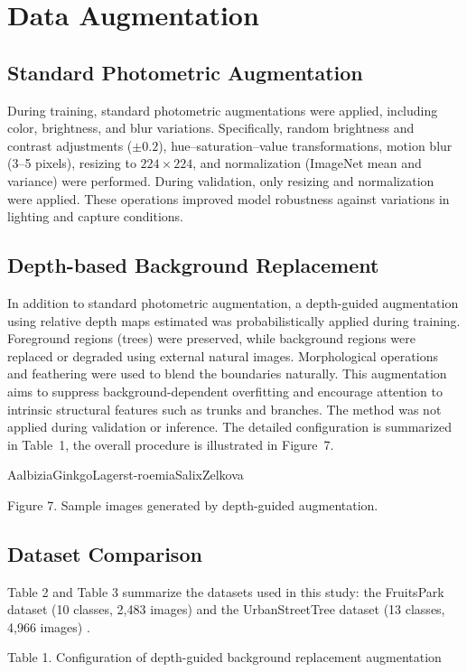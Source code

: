 \section{Data Augmentation}
\subsection{Standard Photometric Augmentation}
During training, standard photometric augmentations were applied, including color, brightness, and blur variations. Specifically, random brightness and contrast adjustments ($\pm 0.2$), hue–saturation–value transformations, motion blur (3–5 pixels), resizing to $224 \times 224$, and normalization (ImageNet mean and variance) were performed. During validation, only resizing and normalization were applied. These operations improved model robustness against variations in lighting and capture conditions.

\subsection{Depth-based Background Replacement}
In addition to standard photometric augmentation, a depth-guided augmentation using relative depth maps estimated  was probabilistically applied during training. Foreground regions (trees) were preserved, while background regions were replaced or degraded using external natural images. Morphological operations and feathering were used to blend the boundaries naturally. This augmentation aims to suppress background-dependent overfitting and encourage attention to intrinsic structural features such as trunks and branches. The method was not applied during validation or inference. The detailed configuration is summarized in Table~1, the overall procedure is illustrated in Figure~7.

Aalbizia\quad Ginkgo\quad Lagerst-roemia\quad Salix\quad Zelkova

Figure 7. Sample images generated by depth-guided augmentation.

\subsection{Dataset Comparison}
Table 2 and Table 3 summarize the datasets used in this study: the FruitsPark dataset (10 classes, 2,483 images) and the UrbanStreetTree dataset (13 classes, 4,966 images) \cite{ref11}. 

Table 1. Configuration of depth-guided background replacement augmentation

